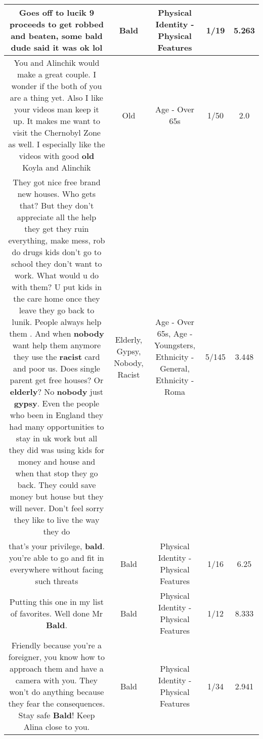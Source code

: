 \documentclass[11pt]{article}
\newlength\mylength
\begin{document}
\begin{center}
\begin{longtable}{|C{.65\mylength}|C{.30\mylength}|C{.12\mylength}|C{.12\mylength}|C{.12\mylength}|}
  \small Goes off to lucik 9 proceeds to get robbed and beaten, some \textbf{bald} dude said it was ok lol\normalsize   & Bald & Physical Identity - Physical Features & 1/19 & 5.263 \\  \hline
  \small You and Alinchik would make a great couple. I wonder if the both of you are a thing yet. Also I like your videos man keep it up. It makes me want to visit the Chernobyl Zone as well. I especially like the videos with good \textbf{old} Koyla and Alinchik\normalsize   & Old & Age - Over 65s & 1/50 & 2.0 \\  \hline
  \small They got nice free brand new houses. Who gets that? But they don't appreciate all the help they get they ruin everything, make mess, rob do drugs kids don't go to school they don't want to work. What would u do with them? U put kids in the care home once they leave they go back to lunik. People always help them . And when \textbf{nobody} want help them anymore they use the \textbf{racist} card and poor us. Does single parent get free houses? Or \textbf{elderly}? No \textbf{nobody} just \textbf{gypsy}. Even the people who been in England they had many opportunities to stay in uk work but all they did was using kids for money and house and when that stop they go back. They could save money but house but they will never. Don't feel sorry they like to live the way they do\normalsize   & Elderly, Gypsy, Nobody, Racist & Age - Over 65s, Age - Youngsters, Ethnicity - General, Ethnicity - Roma & 5/145 & 3.448 \\  \hline
  \small that's your privilege, \textbf{bald}. you're able to go and fit in everywhere without facing such threats\normalsize   & Bald & Physical Identity - Physical Features & 1/16 & 6.25 \\  \hline
  \small Putting this one in my list of favorites. Well done Mr \textbf{Bald}.\normalsize   & Bald & Physical Identity - Physical Features & 1/12 & 8.333 \\  \hline
  \small Friendly because you're a foreigner, you know how to approach them and have a camera with you. They won't do anything because they fear the consequences. Stay safe \textbf{Bald}! Keep Alina close to you.\normalsize   & Bald & Physical Identity - Physical Features & 1/34 & 2.941 \\  \hline

\end{longtable}
\end{center}
\end{document}
